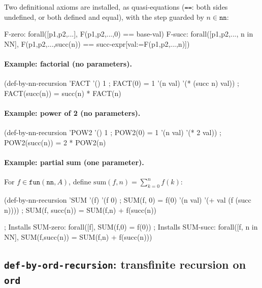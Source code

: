 Two definitional axioms are installed, as quasi-equations (\texttt{==}:
both sides undefined, or both defined and equal), with the step guarded by
$n \in \mathtt{nn}$:
\begin{VNBsnip}
F-zero: forall([p1,p2,...], F(p1,p2,...,0) == base-val)
F-succ: forall([p1,p2,..., n in NN],
          F(p1,p2,...,succ(n)) == succ-expr[val:=F(p1,p2,...,n)])
\end{VNBsnip}

\paragraph{Example: factorial (no parameters).}
\begin{VNBcode}
(def-by-nn-recursion 'FACT '()
  1                           ; FACT(0) = 1
  '(n val) '(* (succ n) val)) ; FACT(succ(n)) = succ(n) * FACT(n)
\end{VNBcode}

\paragraph{Example: power of 2 (no parameters).}
\begin{VNBcode}
(def-by-nn-recursion 'POW2 '()
  1                       ; POW2(0) = 1
  '(n val) '(* 2 val))   ; POW2(succ(n)) = 2 * POW2(n)
\end{VNBcode}

\paragraph{Example: partial sum (one parameter).}
\begin{sloppypar}For $f \in \mathtt{fun}(\mathtt{nn}, A)$, define
$\mathrm{sum}(f, n) = \sum_{k=0}^{n} f(k)$:\end{sloppypar}
\begin{VNBcode}
(def-by-nn-recursion 'SUM '(f)
  '(f 0)                          ; SUM(f, 0) = f(0)
  '(n val) '(+ val (f (succ n)))) ; SUM(f, succ(n)) = SUM(f,n) + f(succ(n))

; Installs SUM-zero: forall([f], SUM(f,0) = f(0))
; Installs SUM-succ: forall([f, n in NN], SUM(f,succ(n)) = SUM(f,n) + f(succ(n)))
\end{VNBcode}

\subsection{\texttt{def-by-ord-recursion}: transfinite recursion on \texttt{ord}}

